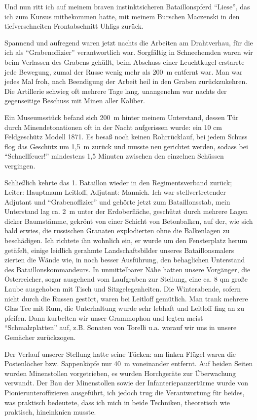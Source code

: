 Und nun ritt ich auf meinem braven instinktsicheren Bataillonspferd \enquote{Liese}, das ich zum Kursus mitbekommen hatte, mit meinem Burschen Maczenski in den tiefverschneiten Frontabschnitt Uhligs zurück.

Spannend und aufregend waren jetzt nachts die Arbeiten am Drahtverhau, für die ich als \enquote{Grabenoffizier} verantwortlich war. Sorgfältig in Schneehemden waren wir beim Verlassen des Grabens gehüllt, beim Abschuss einer Leuchtkugel erstarrte jede Bewegung, zumal der Russe wenig mehr als 200~m entfernt war. Man war jedes Mal froh, nach Beendigung der Arbeit heil in den Graben zurückzukehren. Die Artillerie schwieg oft mehrere Tage lang, unangenehm war nachts der gegenseitige Beschuss mit Minen aller Kaliber.

Ein Museumsstück befand sich 200~m hinter meinem Unterstand, dessen Tür durch Minendetonationen oft in der Nacht aufgerissen wurde: ein 10 cm Feldgeschütz Modell 1871. Es besaß noch keinen Rohrrücklauf, bei jedem Schuss flog das Geschütz um 1,5~m zurück und musste neu gerichtet werden, sodass bei \enquote{Schnellfeuer!} mindestens 1,5 Minuten zwischen den einzelnen Schüssen vergingen.

Schließlich kehrte das 1. Bataillon wieder in den Regimentsverband zurück; Leiter: Hauptmann Leitloff, Adjutant: Mannich. Ich war stellvertretender Adjutant und \enquote{Grabenoffizier} und gehörte jetzt zum Bataillonsstab, mein Unterstand lag ca. 2~m unter der Erdoberfläche, geschützt durch mehrere Lagen dicker Baumstämme, gekrönt von einer Schicht von Betonbalken, auf der, wie sich bald erwies, die russischen Granaten explodierten ohne die Balkenlagen zu beschädigen. Ich richtete ihn wohnlich ein, er wurde um den Fensterplatz herum getäfelt, einige leidlich gerahmte Landschaftsbilder unseres Bataillonsmalers zierten die Wände wie, in noch besser Ausführung, den behaglichen Unterstand des Bataillonskommandeurs. In unmittelbarer Nähe hatten unsere Vorgänger, die Österreicher, sogar ausgehend vom Laufgraben zur Stellung, eine ca. 8 qm große Laube ausgehoben mit Tisch und Sitzgelegenheiten. Die Winterabende, sofern nicht durch die Russen gestört, waren bei Leitloff gemütlich. Man trank mehrere Glas Tee mit Rum, die Unterhaltung wurde sehr lebhaft und Leitloff fing an zu pfeifen. Dann kurbelten wir unser Grammophon und legten meist \enquote{Schmalzplatten} auf, z.B. Sonaten von Torelli u.a. worauf wir uns in unsere Gemächer zurückzogen.

Der Verlauf unserer Stellung hatte seine Tücken: am linken Flügel waren die Postenlöcher bzw. Sappenköpfe nur 40~m voneinander entfernt. Auf beiden Seiten wurden Minenstollen vorgetrieben, es wurden Horchgeräte zur Überwachung verwandt. Der Bau der Minenstollen sowie der Infanteriepanzertürme wurde von Pionierunteroffizieren ausgeführt, ich jedoch trug die Verantwortung für beides, was praktisch bedeutete, dass ich mich in beide Techniken, theoretisch wie praktisch, hineinknien musste.

